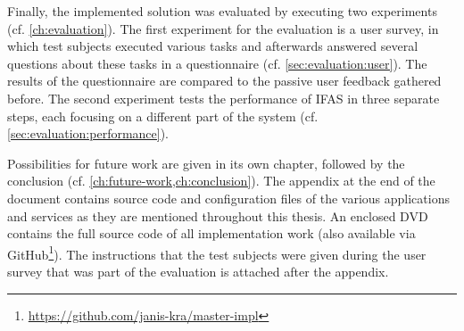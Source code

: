 Finally, the implemented solution was evaluated by executing two experiments (cf. \cref{ch:evaluation}).
The first experiment for the evaluation is a user survey, in which test subjects executed various tasks and afterwards answered several questions about these tasks in a questionnaire (cf. \cref{sec:evaluation:user}).
The results of the questionnaire are compared to the passive user feedback gathered before.
The second experiment tests the performance of \ac{IFAS} in three separate steps, each focusing on a different part of the system (cf. \cref{sec:evaluation:performance}).

Possibilities for future work are given in its own chapter, followed by the conclusion (cf. \cref{ch:future-work,ch:conclusion}).
The appendix at the end of the document contains source code and configuration files of the various applications and services as they are mentioned throughout this thesis.
An enclosed DVD contains the full source code of all implementation work (also available via GitHub\footnote{\url{https://github.com/janis-kra/master-impl}}).
The instructions that the test subjects were given during the user survey that was part of the evaluation is attached after the appendix.

